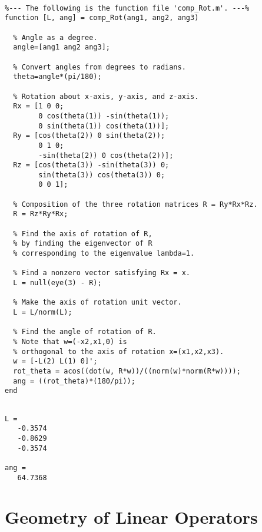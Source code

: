 \begin{sol}

\begin{verbatim}

%--- The following is the function file 'comp_Rot.m'. ---%
function [L, ang] = comp_Rot(ang1, ang2, ang3)

  % Angle as a degree.
  angle=[ang1 ang2 ang3];

  % Convert angles from degrees to radians.
  theta=angle*(pi/180); 

  % Rotation about x-axis, y-axis, and z-axis.
  Rx = [1 0 0; 
        0 cos(theta(1)) -sin(theta(1)); 
        0 sin(theta(1)) cos(theta(1))];
  Ry = [cos(theta(2)) 0 sin(theta(2)); 
        0 1 0; 
        -sin(theta(2)) 0 cos(theta(2))];
  Rz = [cos(theta(3)) -sin(theta(3)) 0; 
        sin(theta(3)) cos(theta(3)) 0; 
        0 0 1];

  % Composition of the three rotation matrices R = Ry*Rx*Rz.
  R = Rz*Ry*Rx; 

  % Find the axis of rotation of R,
  % by finding the eigenvector of R 
  % corresponding to the eigenvalue lambda=1.

  % Find a nonzero vector satisfying Rx = x.
  L = null(eye(3) - R);

  % Make the axis of rotation unit vector. 
  L = L/norm(L);  

  % Find the angle of rotation of R.
  % Note that w=(-x2,x1,0) is 
  % orthogonal to the axis of rotation x=(x1,x2,x3).
  w = [-L(2) L(1) 0]';
  rot_theta = acos((dot(w, R*w))/((norm(w)*norm(R*w))));
  ang = ((rot_theta)*(180/pi));
end
\end{verbatim}


\begin{outputs}

\begin{verbatim}

L =
   -0.3574
   -0.8629
   -0.3574

ang =
   64.7368
\end{verbatim}
\end{outputs}

\end{sol}
\newpage

\section{Geometry of Linear Operators}

